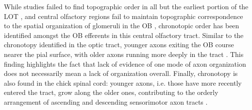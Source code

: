 \label{sec:LOT}
While studies failed to find topographic order in all but the earliest portion of the LOT \cite{price1975observation}, and central olfactory regions fail to maintain topographic correspondence to the spatial organization of glomeruli in the OB \cite{luskin1982distribution,sosulski2011distinct}, chronotopic order has been identified amongst the OB efferents in this central olfactory tract.
Similar to the chronotopy identified in the optic tract, younger axons exiting the OB course nearer the pial surface, with older axons running more deeply in the tract \cite{yamatani2004chronotopic}. 
This finding highlights the fact that lack of evidence of one mode of axon organization does not necessarily mean a lack of organization overall.
Finally, chronotopy is also found in the chick spinal cord: younger axons, i.e. those have more recently entered the tract, grow along the older ones, contributing to the orderly arrangement of ascending and descending sensorimotor axon tracts \cite{nornes1980pattern}.